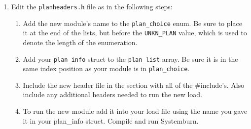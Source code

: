 \begin{enumerate}
        \item Edit the \verb!planheaders.h! file as in the following steps:
		\begin{enumerate} 
			\item Add the new module's name to the \verb!plan_choice! enum. Be sure to place it at the end of the lists, but before the \verb!UNKN_PLAN! value, which is used to denote the length of the enumeration.
			\item Add your \verb!plan_info! struct to the \verb!plan_list! array. Be sure it is in the same index position as your module is in \verb!plan_choice!.
			\item Include the new header file in the section with all of the \#include's. Also include any additional headers needed to run the new load.
		        \item To run the new module add it into your load file using the name you gave it in your plan\_info struct. Compile and run Systemburn.
		\end{enumerate}
\end{enumerate}
